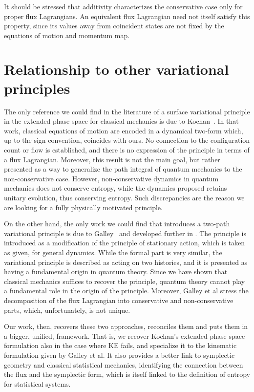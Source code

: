 \documentclass[12pt]{article}
\begin{document}
It should be stressed that additivity characterizes the conservative case only for proper flux Lagrangians. An equivalent flux Lagrangian need not itself satisfy this property, since its values away from coincident states are not fixed by the equations of motion and momentum map.

\section{Relationship to other variational principles}

The only reference we could find in the literature of a surface variational principle in the extended phase space for classical mechanics is due to Kochan~\cite{kochanstrings,kochan}. In that work, classical equations of motion are encoded in a dynamical two-form which, up to the sign convention, coincides with ours. No connection to the configuration count or flow is established, and there is no expression of the principle in terms of a flux Lagrangian. Moreover, this result is not the main goal, but rather presented as a way to generalize the path integral of quantum mechanics to the non-conservative case. However, non-conservative dynamics in quantum mechanics does not conserve entropy, while the dynamics proposed retains unitary evolution, thus conserving entropy. Such discrepancies are the reason we are looking for a fully physically motivated principle.

On the other hand, the only work we could find that introduces a two-path variational principle is due to Galley~\cite{galley} and developed further in \cite{galleytsangstein,martindiego}. The principle is introduced as a modification of the principle of stationary action, which is taken as given, for general dynamics. While the formal part is very similar, the variational principle is described as acting on two histories, and it is presented as having a fundamental origin in quantum theory. Since we have shown that classical mechanics suffices to recover the principle, quantum theory cannot play a fundamental role in the origin of the principle. Moreover, Galley et al stress the decomposition of the flux Lagrangian into conservative and non-conservative parts, which, unfortunately, is not unique.

Our work, then, recovers these two approaches, reconciles them and puts them in a bigger, unified, framework. That is, we recover Kochan's extended-phase-space formulation also in the case where KE fails, and specialize it to the kinematic formulation given by Galley et al. It also provides a better link to symplectic geometry and classical statistical mechanics, identifying the connection between the flux and the symplectic form, which is itself linked to the definition of entropy for statistical systems.
\end{document}
